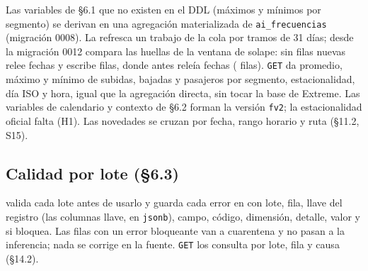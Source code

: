 \documentclass[10pt,a4paper]{article}
\begin{document}
Las variables de §6.1 que no existen en el DDL (máximos y mínimos por segmento) se derivan en una agregación
materializada de \texttt{ai\_frecuencias} (migración 0008). La refresca un trabajo de la cola por tramos de 31 días;
desde la migración 0012 compara las huellas
de la ventana de solape: sin filas nuevas relee \SegSinCambiosFechas{} fechas y escribe \SegSinCambiosEscritas{}
filas, donde antes releía \SegSinCambiosFechasAntes{} fechas (\SegSinCambiosFilasAntes{} filas).
 \texttt{GET}
 da promedio, máximo y mínimo de subidas, bajadas y pasajeros por segmento,
estacionalidad, día ISO y hora, igual que la agregación directa, sin tocar la base de Extreme.
 Las variables de calendario y contexto de §6.2 forman la versión
\texttt{fv2}; la estacionalidad oficial falta (H1). Las novedades se cruzan por fecha, rango horario y ruta (§11.2,
S15). 

\subsection{Calidad por lote (§6.3)}
 valida cada lote antes de usarlo y guarda cada error en
 con lote, fila, llave del registro (las columnas llave, en \texttt{jsonb}),
campo, código, dimensión, detalle, valor y si bloquea. Las filas con un error bloqueante van a cuarentena y no pasan a
la inferencia; nada se corrige en la fuente. \texttt{GET} 
los consulta por lote, fila y causa (§14.2).
\end{document}
